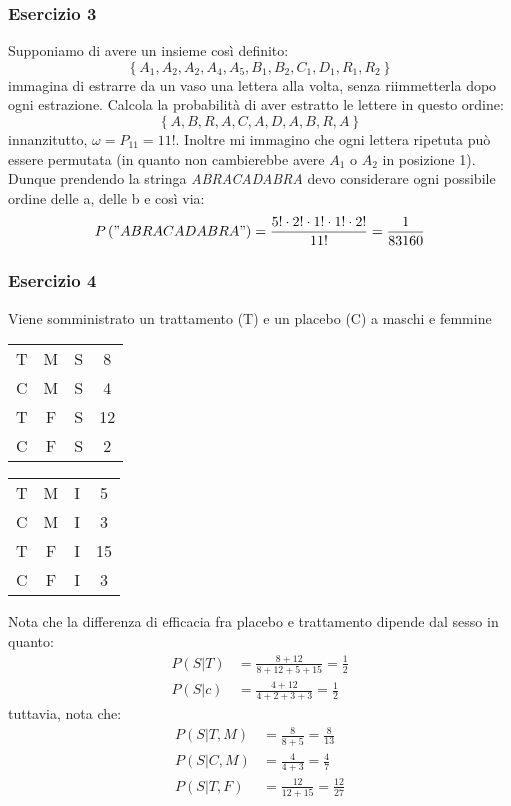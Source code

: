 \subsubsection*{Esercizio 3}
Supponiamo di avere un insieme così definito:
\[
	\left\{A_1, A_2,A_2,A_4,A_5,B_1,B_2,C_1,D_1,R_1,R_2\right\}
\]
immagina di estrarre da un vaso una lettera alla volta, senza riimmetterla dopo ogni estrazione. Calcola la probabilità di aver estratto le lettere in questo ordine:
\[
	\left\{A,B,R,A,C,A,D,A,B,R,A\right\}
\]
innanzitutto, $ \omega = P_11 = 11! $. Inoltre mi immagino che ogni lettera ripetuta può essere permutata (in quanto non cambierebbe avere $ A_1 $ o $ A_2 $ in posizione 1). Dunque prendendo la stringa \textit{ABRACADABRA} devo considerare ogni possibile ordine delle a, delle b e così via:
\[
	P\left("ABRACADABRA"\right) = \frac{5! \cdot  2! \cdot 1! \cdot 1! \cdot 2!}{11!} = \frac{1}{83160}
\]
\subsubsection*{Esercizio 4}
Viene somministrato un trattamento (T) e un placebo (C) a maschi e femmine
\begin{table}[h!]
	\centering
	\begin{tabular}{|c c c c|}
		\hline
		T & M & S & 8  \\
		C & M & S & 4  \\
		T & F & S & 12 \\
		C & F & S & 2  \\
		\hline
	\end{tabular}
	\begin{tabular}{|c c c c|}
		\hline
		T & M & I & 5  \\
		C & M & I & 3  \\
		T & F & I & 15 \\
		C & F & I & 3  \\
		\hline
	\end{tabular}
\end{table}
Nota che la differenza di efficacia fra placebo e trattamento dipende dal sesso in quanto:
\begin{align*}
	P\left(S | T\right) & = \frac{8 + 12}{8 + 12 + 5 + 15} = \frac{1}{2} \\
	P\left(S | c\right) & = \frac{4 + 12}{4 + 2 + 3 + 3} = \frac{1}{2}
\end{align*}
tuttavia, nota che:
\begin{align*}
	P\left(S | T, M\right)  & = \frac{ 8}{ 8 + 5}= \frac{8}{13}    \\
	P\left(S | C , M\right) & = \frac{4}{4 + 3} = \frac{4}{7}      \\
	P\left(S | T , F\right) & = \frac{12}{12 + 15} = \frac{12}{27}
\end{align*}
